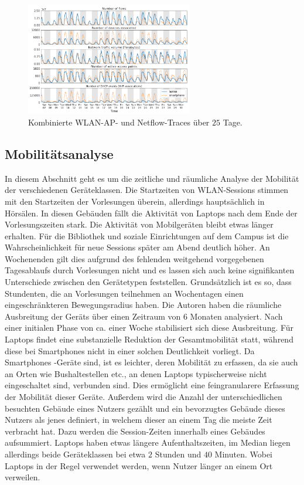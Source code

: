 \documentclass[12pt, a4paper]{article}
\begin{document}
\begin{figure}[H]
    \centering
    \includegraphics[width=0.65\textwidth]{img/traces.png}
    \caption{Kombinierte WLAN-AP- und Netflow-Traces über $25$ Tage. \cite{Alipour2018}}
    \label{fig:traces}
\end{figure}

\vfill
\pagebreak

\subsection{Mobilitätsanalyse}

In diesem Abschnitt geht es um die zeitliche und räumliche Analyse der Mobilität der verschiedenen Geräteklassen.
Die Startzeiten von WLAN-Sessions stimmen mit den Startzeiten der Vorlesungen überein, allerdings hauptsächlich in Hörsälen.
In diesen Gebäuden fällt die Aktivität von Laptops nach dem Ende der Vorlesungszeiten stark. Die Aktivität von Mobilgeräten
bleibt etwas länger erhalten. Für die Bibliothek und soziale Einrichtungen auf dem Campus ist die Wahrscheinlichkeit
für neue Sessions später am Abend deutlich höher. An Wochenenden gilt dies aufgrund des fehlenden weitgehend vorgegebenen
Tagesablaufs durch Vorlesungen nicht und es lassen sich auch keine signifikanten Unterschiede zwischen den Gerätetypen 
feststellen. \cite{Alipour2018} \newline
Grundsätzlich ist es so, dass Stundenten, die an Vorlesungen teilnehmen an Wochentagen einen eingeschränkteren Bewegungsradius haben.
Die Autoren haben die räumliche Ausbreitung der Geräts über einen Zeitraum von 6 Monaten analysiert.
Nach einer initialen Phase von ca. einer Woche stabilisiert sich diese Ausbreitung. Für Laptops findet eine 
substanzielle Reduktion der Gesamtmobilität statt, während diese bei Smartphones nicht in einer solchen Deutlichkeit vorliegt.
Da Smartphones -Geräte sind, ist es leichter, deren Mobilität zu erfassen, da sie auch an Orten
wie Bushaltestellen etc., an denen Laptops typischerweise nicht eingeschaltet sind, verbunden sind.
Dies ermöglicht eine feingranularere Erfassung der Mobilität dieser Geräte. \cite{Alipour2018}
Außerdem wird die Anzahl der unterschiedlichen besuchten Gebäude eines Nutzers gezählt und ein bevorzugtes
Gebäude dieses Nutzers als jenes definiert, in welchem dieser an einem Tag die meiste Zeit verbracht hat.
Dazu werden die Session-Zeiten innerhalb eines Gebäudes aufsummiert.
Laptops haben etwas längere Aufenthaltszeiten, im Median liegen allerdings beide Geräteklassen bei etwa $2$ Stunden
und $40$ Minuten. Wobei Laptops in der Regel verwendet werden, wenn Nutzer länger an einem Ort verweilen.
\end{document}
